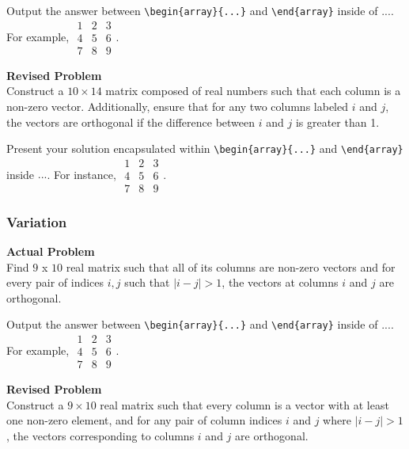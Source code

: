 Output the answer between \verb|\begin{array}{...}| and \verb|\end{array}| inside of $\boxed{...}$. For example, $\boxed{\begin{array}{ccc}1 & 2 & 3 \\ 4 & 5 & 6 \\ 7 & 8 & 9\end{array}}$.

\textbf{Revised Problem}\\
Construct a $10 \times 14$ matrix composed of real numbers such that each column is a non-zero vector. Additionally, ensure that for any two columns labeled $i$ and $j$, the vectors are orthogonal if the difference between $i$ and $j$ is greater than 1.

Present your solution encapsulated within \verb|\begin{array}{...}| and \verb|\end{array}| inside $\boxed{...}$. For instance, $\boxed{\begin{array}{ccc}1 & 2 & 3 \\ 4 & 5 & 6 \\ 7 & 8 & 9\end{array}}$.

\subsubsection{Variation}
\textbf{Actual Problem}\\
Find $9$ x $10$ real matrix such that all of its columns are non-zero vectors and for every pair of indices $i, j$ such that $|i - j| > 1$, the vectors at columns $i$ and $j$ are orthogonal.

Output the answer between \verb|\begin{array}{...}| and \verb|\end{array}| inside of $\boxed{...}$. For example, $\boxed{\begin{array}{ccc}1 & 2 & 3 \\ 4 & 5 & 6 \\ 7 & 8 & 9\end{array}}$.

\textbf{Revised Problem}\\
Construct a $9 \times 10$ real matrix such that every column is a vector with at least one non-zero element, and for any pair of column indices $i$ and $j$ where $|i - j| > 1$, the vectors corresponding to columns $i$ and $j$ are orthogonal.

